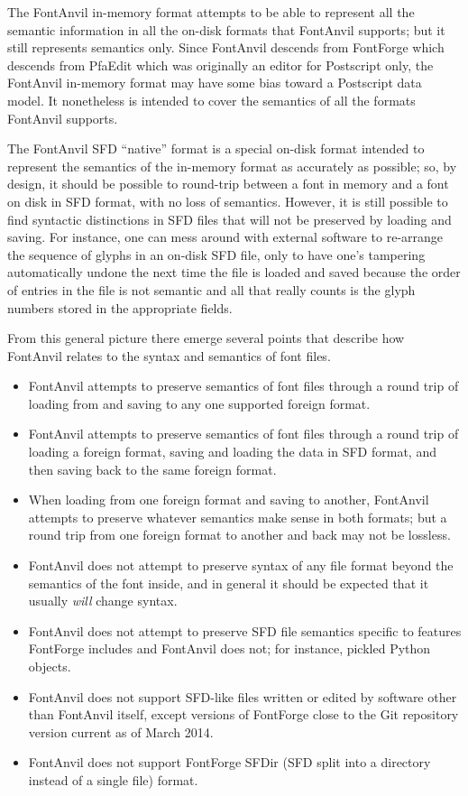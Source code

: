 The FontAnvil in-memory format attempts to be able to represent all the
semantic information in all the on-disk formats that FontAnvil supports; but
it still represents semantics only.  Since FontAnvil descends from FontForge
which descends from PfaEdit which was originally an editor for Postscript
only, the FontAnvil in-memory format may have some bias toward a Postscript
data model.  It nonetheless is intended to cover the semantics of all the
formats FontAnvil supports.

The FontAnvil SFD ``native'' format is a special on-disk format intended to
represent the semantics of the in-memory format as accurately as possible;
so, by design, it should be possible to round-trip between a font in memory
and a font on disk in SFD format, with no loss of semantics.  However, it is
still possible to find syntactic distinctions in SFD files that will not be
preserved by loading and saving.  For instance, one can mess around with
external software to re-arrange the sequence of glyphs in an on-disk SFD
file, only to have one's tampering automatically undone the next time the
file is loaded and saved because the order of entries in the file is not
semantic and all that really counts is the glyph numbers stored in the
appropriate fields.

From this general picture there emerge several points that describe how
FontAnvil relates to the syntax and semantics of font files.

\begin{itemize}
\item FontAnvil attempts to preserve semantics of font files through
a round trip of loading from and saving to any one supported foreign format. 
\item FontAnvil attempts to preserve semantics of font files through 
a round trip of loading a foreign format, saving and loading the data in SFD
format, and then saving back to the same foreign format.
\item When loading from one foreign format and saving to another, FontAnvil
attempts to preserve whatever semantics make sense in both formats; but a
round trip from one foreign format to another and back may not be lossless.
\item FontAnvil does not attempt to preserve syntax of any file format
beyond the semantics of the font inside, and in general it should be
expected that it usually \emph{will} change syntax.
\item FontAnvil does not attempt to preserve SFD file semantics specific to
features FontForge includes and FontAnvil does not; for instance, pickled
Python objects.
\item FontAnvil does not support SFD-like files written or
edited by software other than FontAnvil itself, except versions of FontForge
close to the Git repository version current as of March 2014.
\item FontAnvil does not support FontForge SFDir (SFD split into a directory
instead of a single file) format.
\end{itemize}

